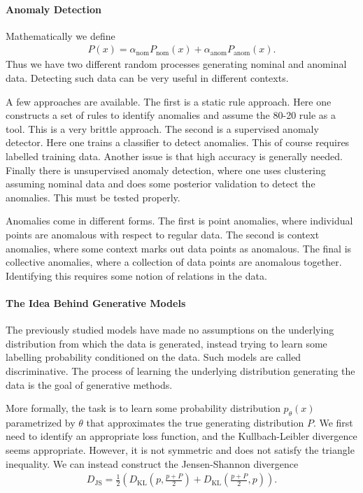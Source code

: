 \paragraph{Anomaly Detection}
Mathematically we define
\begin{align*}
	P(x) = \alpha_{\text{nom}}P_{\text{nom}}(x) + \alpha_{\text{anom}}P_{\text{anom}}(x).
\end{align*}
Thus we have two different random processes generating nominal and anominal data. Detecting such data can be very useful in different contexts.

A few approaches are available. The first is a static rule approach. Here one constructs a set of rules to identify anomalies and assume the 80-20 rule as a tool.  This is a very brittle approach. The second is a supervised anomaly detector. Here one trains a classifier to detect anomalies. This of course requires labelled training data. Another issue is that high accuracy is generally needed. Finally there is unsupervised anomaly detection, where one uses clustering assuming nominal data and does some posterior validation to detect the anomalies. This must be tested properly.

Anomalies come in different forms. The first is point anomalies, where individual points are anomalous with respect to regular data. The second is context anomalies, where some context marks out data points as anomalous. The final is collective anomalies, where a collection of data points are anomalous together. Identifying this requires some notion of relations in the data.

\paragraph{The Idea Behind Generative Models}
The previously studied models have made no assumptions on the underlying distribution from which the data is generated, instead trying to learn some labelling probability conditioned on the data. Such models are called discriminative. The process of learning the underlying distribution generating the data is the goal of generative methods.

More formally, the task is to learn some probability distribution $p_{\theta}(x)$ parametrized by $\theta$ that approximates the true generating distribution $P$. We first need to identify an appropriate loss function, and the Kullbach-Leibler divergence seems appropriate. However, it is not symmetric and does not satisfy the triangle inequality. We can instead construct the Jensen-Shannon divergence
\begin{align*}
	D_{\text{JS}} = \frac{1}{2}\left(D_{\text{KL}}\left(p, \frac{p + P}{2}\right) + D_{\text{KL}}\left(\frac{p + P}{2}, p\right)\right).
\end{align*}

